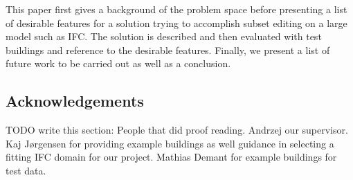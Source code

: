 This paper first gives a background of the problem space before presenting a list of desirable features for a solution trying to accomplish subset editing on a large model such as IFC. The solution is described and then evaluated with test buildings and reference to the desirable features. Finally, we present a list of future work to be carried out as well as a conclusion.

\subsection{Acknowledgements}
TODO write this section: People that did proof reading. Andrzej our supervisor. Kaj Jørgensen for providing example buildings as well guidance in selecting a fitting IFC domain for our project. Mathias Demant for example buildings for test data.

